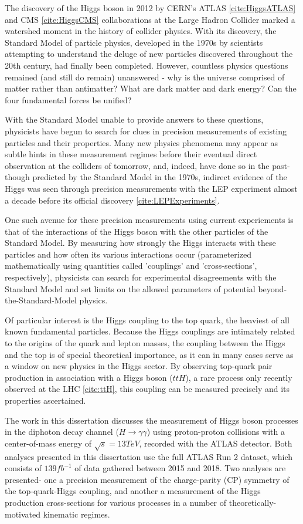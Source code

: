 The discovery of the Higgs boson in 2012 by CERN's ATLAS \ref{cite:HiggsATLAS} and CMS \ref{cite:HiggsCMS} collaborations at the Large Hadron Collider marked a watershed moment in the history of collider physics. With its discovery, the Standard Model of particle physics, developed in the 1970s by scientists attempting to understand the deluge of new particles discovered throughout the 20th century, had finally been completed. However, countless physics questions remained (and still do remain) unanswered - why is the universe comprised of matter rather than antimatter? What are dark matter and dark energy? Can the four fundamental forces be unified?

With the Standard Model unable to provide answers to these questions, physicists have begun to search for clues in precision measurements of existing particles and their properties. Many new physics phenomena may appear as subtle hints in these measurement regimes before their eventual direct observation at the colliders of tomorrow, and, indeed, have done so in the past- though predicted by the Standard Model in the 1970s, indirect evidence of the Higgs was seen through precision measurements with the LEP experiment almost a decade before its official discovery \ref{cite:LEPExperiments}.

One such avenue for these precision measurements using current experiements is that of the interactions of the Higgs boson with the other particles of the Standard Model. By measuring how strongly the Higgs interacts with these particles and how often its various interactions occur (parameterized mathematically using quantities called 'couplings' and 'cross-sections', respectively), physicists can search for experimental disagreements with the Standard Model and set limits on the allowed parameters of potential beyond-the-Standard-Model physics.

Of particular interest is the Higgs coupling to the top quark, the heaviest of all known fundamental particles. Because the Higgs couplings are intimately related to the origins of the quark and lepton masses, the coupling between the Higgs and the top is of special theoretical importance, as it can in many cases serve as a window on new physics in the Higgs sector. By observing top-quark pair production in association with a Higgs boson ($ttH$), a rare process only recently observed at the LHC \ref{cite:ttH}, this coupling can be measured precisely and its properties ascertained.

The work in this dissertation discusses the measurement of Higgs boson processes in the diphoton decay channel ($H \rightarrow \gamma \gamma$) using proton-proton collisions with a center-of-mass energy of $\sqrt{s} = 13 TeV$, recorded with the ATLAS detector.  Both analyses presented in this dissertation use the full ATLAS Run 2 dataset, which consists of $139 fb^{-1}$ of data gathered between 2015 and 2018. Two analyses are presented- one a precision measurement of the charge-parity (CP) symmetry of the top-quark-Higgs coupling, and another a measurement of the Higgs production cross-sections for various processes in a number of theoretically-motivated kinematic regimes.

